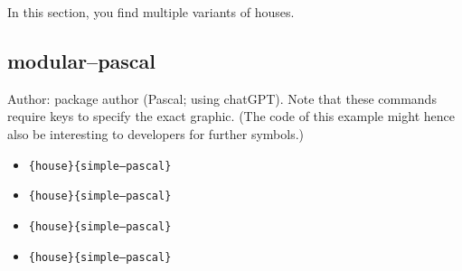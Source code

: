 \documentclass{article}
\begin{document}
In this section, you find multiple variants of houses.

\subsection{modular--pascal}

Author: package author (Pascal; using chatGPT). Note that these commands require keys to specify the exact graphic. (The code of this example might hence also be interesting to developers for further symbols.)

\begin{itemize}
  \item \texttt{\string\everydaySymbol\{house\}\{simple--pascal\}} \dotfill\ 

  \item \texttt{\string\everydaySymbol[config=\{middleDoor,chimney\}]\{house\}\{simple--pascal\}} \dotfill\ 

  \item \texttt{\string\everydaySymbol[config=\{rightDoor,leftWindow\}]\{house\}\{simple--pascal\}} \dotfill\ 

  \item \texttt{\string\everydaySymbol[config=\{twoWindows,middleDoor\}]\{house\}\{simple--pascal\}} \dotfill\ 
\end{itemize}
\end{document}
